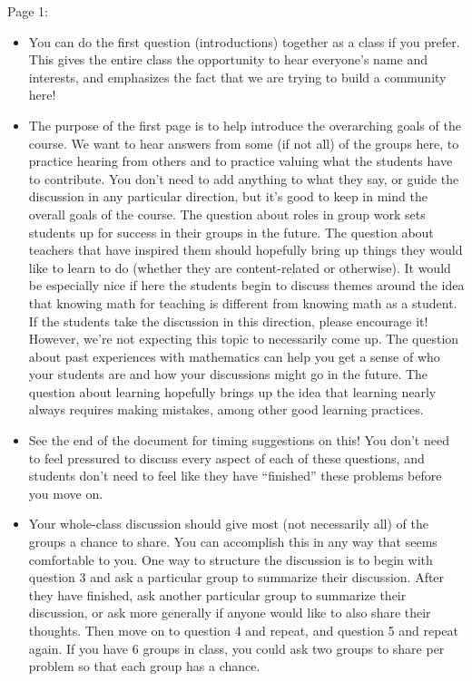 \documentclass[noauthor,nooutcomes]{ximera}
\begin{document}
\begin{instructorNotes}
Page 1:
\begin{itemize}	
	\item You can do the first question (introductions) together as a class if you prefer. This gives the entire class the opportunity to hear everyone's name and interests, and emphasizes the fact that we are trying to build a community here!
	\item The purpose of the first page is to help introduce the overarching goals of the course. We want to hear answers from some (if not all) of the groups here, to practice hearing from others and to practice valuing what the students have to contribute. You don't need to add anything to what they say, or guide the discussion in any particular direction, but it's good to keep in mind the overall goals of the course. The question about roles in group work sets students up for success in their groups in the future. The question about teachers that have inspired them should hopefully bring up things they would like to learn to do (whether they are content-related or otherwise). It would be especially nice if here the students begin to discuss themes around the idea that knowing math for teaching is different from knowing math as a student. If the students take the discussion in this direction, please encourage it! However, we're not expecting this topic to necessarily come up. The question about past experiences with mathematics can help you get a sense of who your students are and how your discussions might go in the future. The question about learning hopefully brings up the idea that learning nearly always requires making mistakes, among other good learning practices.
	\item See the end of the document for timing suggestions on this! You don't need to feel pressured to discuss every aspect of each of these questions, and students don't need to feel like they have ``finished'' these problems before you move on.
	\item Your whole-class discussion should give most (not necessarily all) of the groups a chance to share. You can accomplish this in any way that seems comfortable to you. One way to structure the discussion is to begin with question 3 and ask a particular group to summarize their discussion. After they have finished, ask another particular group to summarize their discussion, or ask more generally if anyone would like to also share their thoughts. Then move on to question 4 and repeat, and question 5 and repeat again. If you have 6 groups in class, you could ask two groups to share per problem so that each group has a chance.
\end{itemize}


\end{instructorNotes}
\end{document}
